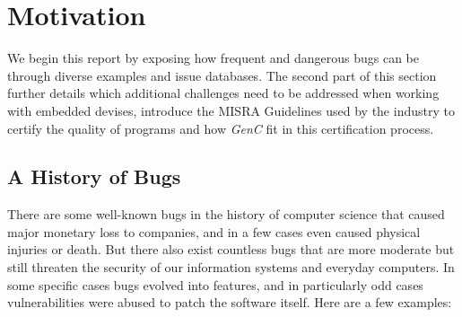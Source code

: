 \documentclass[a4paper,twoside]{article}
\let\oldsection\section
\renewcommand\section{\cleardoublepage\oldsection}
\newcommand{\GenC}{\emph{GenC}\xspace}
\begin{document}
\section{Motivation}
\label{motivation}


We begin this report by exposing how frequent and dangerous bugs can be through
diverse examples and issue databases. The second part of this section further
details which additional challenges need to be addressed when working with
embedded devises, introduce the MISRA Guidelines used by the industry to
certify the quality of programs and how \GenC fit in this certification process.


\subsection{A History of Bugs}
\label{bug_history}

There are some well-known bugs in the history of computer science that caused
major monetary loss to companies, and in a few cases even caused physical
injuries or death. But there also exist countless bugs that are more moderate
but still threaten the security of our information systems and everyday
computers. In some specific cases bugs evolved into features, and in
particularly odd cases vulnerabilities were abused to patch the software itself.
Here are a few examples:
\end{document}
